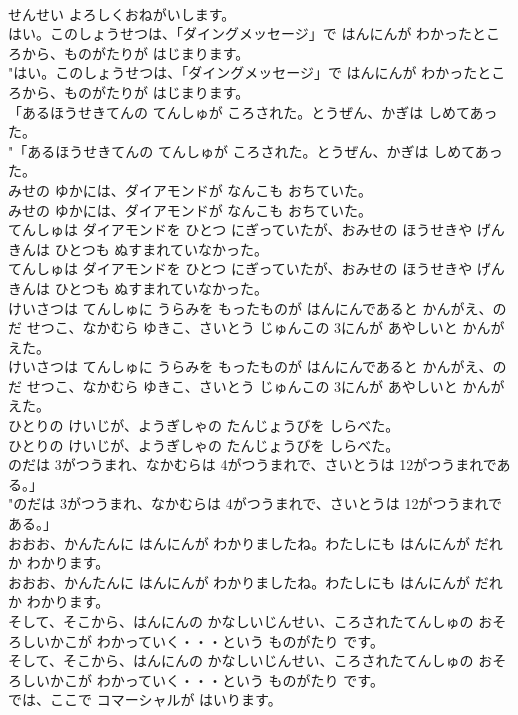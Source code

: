 \documentclass[8pt]{extreport}
\begin{document}
\begin{CJK}{UTF8}{min}
\\	せんせい よろしくおねがいします。 
\\	はい。このしょうせつは、「ダイングメッセージ」で はんにんが わかったところから、ものがたりが はじまります。	
\\	"はい。このしょうせつは、「ダイングメッセージ」で はんにんが わかったところから、ものがたりが はじまります。 
\\	「あるほうせきてんの てんしゅが ころされた。とうぜん、かぎは しめてあった。	
\\	"「あるほうせきてんの てんしゅが ころされた。とうぜん、かぎは しめてあった。 
\\	みせの ゆかには、ダイアモンドが なんこも おちていた。	
\\	みせの ゆかには、ダイアモンドが なんこも おちていた。 
\\	てんしゅは ダイアモンドを ひとつ にぎっていたが、おみせの ほうせきや げんきんは ひとつも ぬすまれていなかった。	
\\	てんしゅは ダイアモンドを ひとつ にぎっていたが、おみせの ほうせきや げんきんは ひとつも ぬすまれていなかった。 
\\	けいさつは てんしゅに うらみを もったものが はんにんであると かんがえ、のだ せつこ、なかむら ゆきこ、さいとう じゅんこの 3にんが あやしいと かんがえた。	
\\	けいさつは てんしゅに うらみを もったものが はんにんであると かんがえ、のだ せつこ、なかむら ゆきこ、さいとう じゅんこの 3にんが あやしいと かんがえた。 
\\	ひとりの けいじが、ようぎしゃの たんじょうびを しらべた。	
\\	ひとりの けいじが、ようぎしゃの たんじょうびを しらべた。 
\\	のだは 3がつうまれ、なかむらは 4がつうまれで、さいとうは 12がつうまれである。」	
\\	"のだは 3がつうまれ、なかむらは 4がつうまれで、さいとうは 12がつうまれである。」 
\\	おおお、かんたんに はんにんが わかりましたね。わたしにも はんにんが だれか わかります。	
\\	おおお、かんたんに はんにんが わかりましたね。わたしにも はんにんが だれか わかります。 
\\	そして、そこから、はんにんの かなしいじんせい、ころされたてんしゅの おそろしいかこが わかっていく・・・という ものがたり です。	
\\	そして、そこから、はんにんの かなしいじんせい、ころされたてんしゅの おそろしいかこが わかっていく・・・という ものがたり です。 
\\	では、ここで コマーシャルが はいります。	

\end{CJK}
\end{document}
